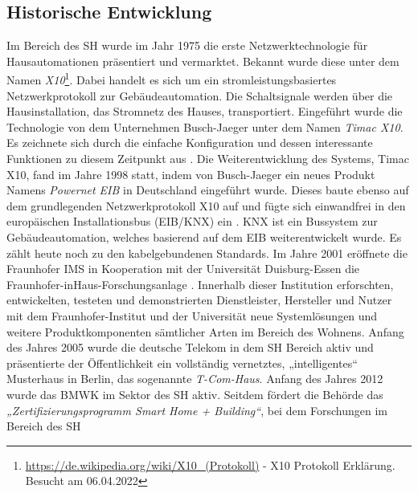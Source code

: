     \subsection{Historische Entwicklung}
    \label{subsec:entwicklung_sh}
        Im Bereich des \acl{SH} wurde im Jahr 1975 die erste Netzwerktechnologie für Hausautomationen 
        präsentiert und vermarktet. Bekannt wurde diese unter dem Namen \textit{X10}\footnote{\url{https://de.wikipedia.org/wiki/X10_(Protokoll)} - X10 Protokoll Erklärung. Besucht am 06.04.2022}. 
        Dabei handelt es sich um ein stromleistungsbasiertes Netzwerkprotokoll zur Gebäudeautomation. Die 
        Schaltsignale werden über die Hausinstallation, das Stromnetz des Hauses, transportiert. Eingeführt wurde die 
        Technologie von dem Unternehmen Busch-Jaeger unter dem Namen \textit{Timac X10}. Es zeichnete sich durch die 
        einfache Konfiguration und dessen interessante Funktionen zu diesem Zeitpunkt aus \cite{aschendorf2014energiemanagement}. %
        Die Weiterentwicklung des Systems, Timac X10, fand im Jahre 1998 statt, indem von Busch-Jaeger ein neues 
        Produkt Namens \textit{Powernet EIB} in Deutschland eingeführt wurde. Dieses baute ebenso auf dem grundlegenden 
        Netzwerkprotokoll X10 auf und fügte sich einwandfrei in den europäischen Installationsbus (EIB/KNX) ein \cite{busch-jaeger}. 
        KNX ist ein Bussystem zur Gebäudeautomation, welches basierend auf dem EIB weiterentwickelt wurde. Es 
        zählt heute noch zu den kabelgebundenen Standards. Im Jahre 2001 eröffnete die Fraunhofer IMS in Kooperation 
        mit der Universität Duisburg-Essen die Fraunhofer-inHaus-Forschungsanlage \cite{fraunhofer-forschungsanlage}. 
        Innerhalb dieser Institution erforschten, entwickelten, testeten und demonstrierten Dienstleister, Hersteller und Nutzer 
        mit dem Fraunhofer-Institut und der Universität neue Systemlösungen und weitere Produktkomponenten sämtlicher Arten 
        im Bereich des Wohnens. Anfang des Jahres 2005 wurde die deutsche Telekom in dem \acl{SH} Bereich aktiv und 
        präsentierte der Öffentlichkeit ein vollständig vernetztes, „intelligentes“ Musterhaus in Berlin, das sogenannte 
        \textit{T-Com-Haus}. Anfang des Jahres 2012 wurde das \ac{BMWK} im Sektor des \acl{SH} aktiv. Seitdem fördert die 
        Behörde das \textit{„Zertifizierungsprogramm Smart Home + Building“}, bei dem Forschungen im Bereich des \acl{SH} 
